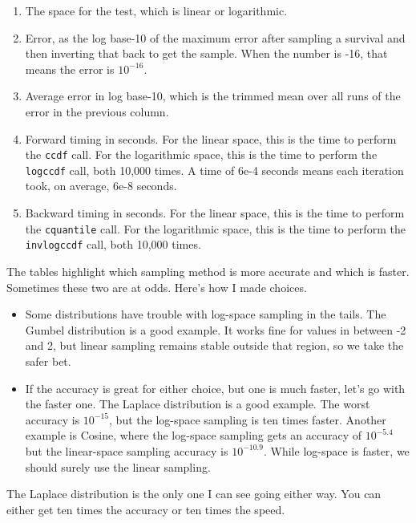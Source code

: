 \documentclass{article}
\begin{document}
\begin{enumerate}
	\item The space for the test, which is linear or logarithmic.

	\item Error, as the log base-10 of the maximum error after sampling a survival and then inverting that back to get the sample. When the number is -16, that means the error is $10^{-16}$.

	\item Average error in log base-10, which is the trimmed mean over all runs of the error in the previous column.

	\item Forward timing in seconds. For the linear space, this is the time to perform the \texttt{ccdf} call. For the logarithmic space, this is the time to perform the \texttt{logccdf} call, both 10,000 times. A time of 6e-4 seconds means each iteration took, on average, 6e-8 seconds.

	\item Backward timing in seconds. For the linear space, this is the time to perform the \texttt{cquantile} call. For the logarithmic space, this is the time to perform the \texttt{invlogccdf} call, both 10,000 times.
\end{enumerate}

\pagebreak


\pagebreak


\pagebreak


The tables highlight which sampling method is more accurate and which is faster. Sometimes these two are at odds. Here's how I made choices.

\begin{itemize}
	\item Some distributions have trouble with log-space sampling in the tails. The Gumbel distribution is a good example. It works fine for values in between -2 and 2, but linear sampling remains stable outside that region, so we take the safer bet.

	\item If the accuracy is great for either choice, but one is much faster, let's go with the faster one. The Laplace distribution is a good example. The worst accuracy is $10^{-15}$, but the log-space sampling is ten times faster. Another example is Cosine, where the log-space sampling gets an accuracy of $10^{-5.4}$ but the linear-space sampling accuracy is $10^{-10.9}$. While log-space is faster, we should surely use the linear sampling.
\end{itemize}

The Laplace distribution is the only one I can see going either way. You can either get ten times the accuracy or ten times the speed.
\end{document}
